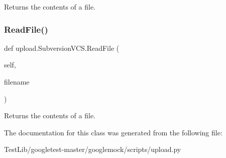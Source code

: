 \begin{DoxyVerb}Returns the contents of a file.\end{DoxyVerb}
 \mbox{\label{classupload_1_1SubversionVCS_a340d269b74386ac863636f6b0683d9f4}} 
\subsubsection{\texorpdfstring{Read\+File()}{ReadFile()}\hspace{0.1cm}{\footnotesize\ttfamily [2/2]}}
{\footnotesize\ttfamily def upload.\+Subversion\+V\+C\+S.\+Read\+File (\begin{DoxyParamCaption}\item[{}]{self,  }\item[{}]{filename }\end{DoxyParamCaption})}

\begin{DoxyVerb}Returns the contents of a file.\end{DoxyVerb}
 

The documentation for this class was generated from the following file\+:\begin{DoxyCompactItemize}
\item 
Test\+Lib/googletest-\/master/googlemock/scripts/upload.\+py\end{DoxyCompactItemize}
